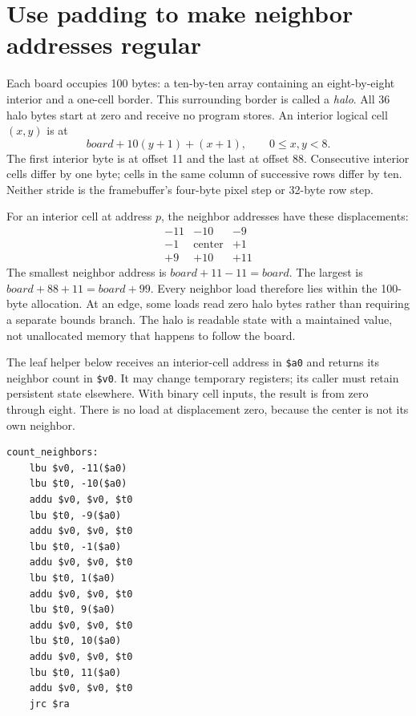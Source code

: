 \section{Use padding to make neighbor addresses regular}

Each board occupies 100 bytes: a ten-by-ten array containing an eight-by-eight
interior and a one-cell border. This surrounding border is called a \emph{halo}.
All 36 halo bytes start at zero and receive no program stores. An interior logical
cell $(x,y)$ is at
\[
  board+10(y+1)+(x+1),\qquad 0\leq x,y<8.
\]
The first interior byte is at offset 11 and the last at offset 88. Consecutive
interior cells differ by one byte; cells in the same column of successive rows
differ by ten. Neither stride is the framebuffer's four-byte pixel step or
32-byte row step.

For an interior cell at address $p$, the neighbor addresses have these displacements:
\[
  \begin{array}{rrr}
    -11 & -10           & -9  \\
    -1  & \text{center} & +1  \\
    +9  & +10           & +11
  \end{array}
\]
The smallest neighbor address is $board+11-11=board$. The largest is
$board+88+11=board+99$. Every neighbor load therefore lies within the 100-byte
allocation. At an edge, some loads read zero halo bytes rather than requiring a
separate bounds branch. The halo is readable state with a maintained value, not
unallocated memory that happens to follow the board.

The leaf helper below receives an interior-cell address in \texttt{\$a0} and
returns its neighbor count in \texttt{\$v0}. It may change temporary registers;
its caller must retain persistent state elsewhere. With binary cell inputs, the
result is from zero through eight. There is no load at displacement zero, because
the center is not its own neighbor.

\noindent\begin{minipage}{\linewidth}
  \begin{verbatim}
count_neighbors:
    lbu $v0, -11($a0)
    lbu $t0, -10($a0)
    addu $v0, $v0, $t0
    lbu $t0, -9($a0)
    addu $v0, $v0, $t0
    lbu $t0, -1($a0)
    addu $v0, $v0, $t0
    lbu $t0, 1($a0)
    addu $v0, $v0, $t0
    lbu $t0, 9($a0)
    addu $v0, $v0, $t0
    lbu $t0, 10($a0)
    addu $v0, $v0, $t0
    lbu $t0, 11($a0)
    addu $v0, $v0, $t0
    jrc $ra
\end{verbatim}
\end{minipage}

